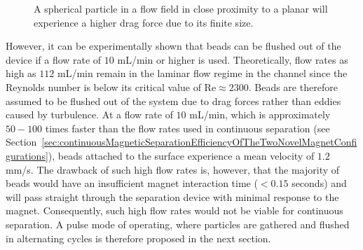 \begin{figure}[htb]
\centering
{}
\caption[Schematic of spherical particle in a flow field in proximity to a planar wall]{A spherical particle in a flow field in close proximity to a planar will experience a higher drag force due to its finite size.}
\label{fig:particleStuckAtPlanarSurfaceVelocity}
\end{figure}

However, it can be experimentally shown that beads can be flushed out of the device if a flow rate of $10$ mL/min or higher is used. Theoretically, flow rates as high as $112$ mL/min remain in the laminar flow regime in the channel since the Reynolds number is below its critical value of $\text{Re} \approx 2300$. Beads are therefore assumed to be flushed out of the system due to drag forces rather than eddies caused by turbulence. At a flow rate of $10$ mL/min, which is approximately $50-100$ times faster than the flow rates used in continuous separation (see Section~\ref{sec:continuousMagneticSeparationEfficiencyOfTheTwoNovelMagnetConfigurations}), beads attached to the surface experience a mean velocity of $1.2$ mm/s. The drawback of such high flow rates is, however, that the majority of beads would have an insufficient magnet interaction time ($<0.15$ seconds) and will pass straight through the separation device with minimal response to the magnet. Consequently, such high flow rates would not be viable for continuous separation. A pulse mode of operating, where particles are gathered and flushed in alternating cycles is therefore proposed in the next section.

